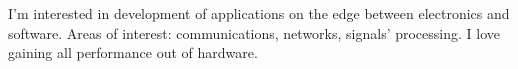 


\begin{cventries}


\begin{flushleft}

I'm interested in development of applications on the edge between electronics and software.
Areas of interest: communications, networks, signals' processing. I love gaining all performance out of hardware.

\end{flushleft}


\end{cventries}